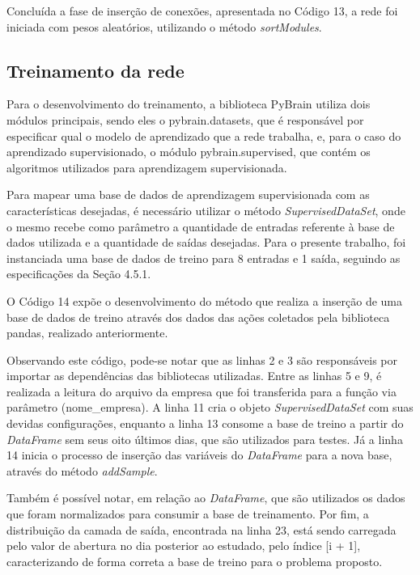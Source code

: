 

Concluída a fase de inserção de conexões, apresentada no Código 13, a rede foi iniciada com pesos aleatórios, utilizando o método \textit{sortModules}.

\subsection{Treinamento da rede}
Para o desenvolvimento do treinamento, a biblioteca PyBrain utiliza dois módulos principais, sendo eles o pybrain.datasets, que é responsável por especificar qual o modelo de aprendizado que a rede trabalha, e, para o caso do aprendizado supervisionado, o módulo pybrain.supervised, que contém os algoritmos utilizados para aprendizagem supervisionada.

Para mapear uma base de dados de aprendizagem supervisionada com as características desejadas, é necessário utilizar o método \textit{SupervisedDataSet}, onde o mesmo recebe como parâmetro a quantidade de entradas referente à base de dados utilizada e a quantidade de saídas desejadas. Para o presente trabalho, foi instanciada uma base de dados de treino para 8 entradas e 1 saída, seguindo as especificações da Seção 4.5.1.

O Código 14 expõe o desenvolvimento do método que realiza a inserção de uma base de dados de treino através dos dados das ações coletados pela biblioteca pandas, realizado anteriormente.



Observando este código, pode-se notar que as linhas 2 e 3 são responsáveis por importar as dependências das bibliotecas utilizadas. Entre as linhas 5 e 9, é realizada a leitura do arquivo da empresa que foi transferida para a função via parâmetro (nome\_empresa). A linha 11 cria o objeto \textit{SupervisedDataSet} com suas devidas configurações, enquanto a linha 13 consome a base de treino a partir do \textit{DataFrame} sem seus oito últimos dias, que são utilizados para testes. Já a linha 14 inicia o processo de inserção das variáveis do \textit{DataFrame} para a nova base, através do método \textit{addSample}.

Também é possível notar, em relação ao \textit{DataFrame}, que são utilizados os dados que foram normalizados para consumir a base de treinamento. Por fim, a distribuição da camada de saída, encontrada na linha 23, está sendo carregada pelo valor de abertura no dia posterior ao estudado, pelo índice [i + 1], caracterizando de forma correta a base de treino para o problema proposto.